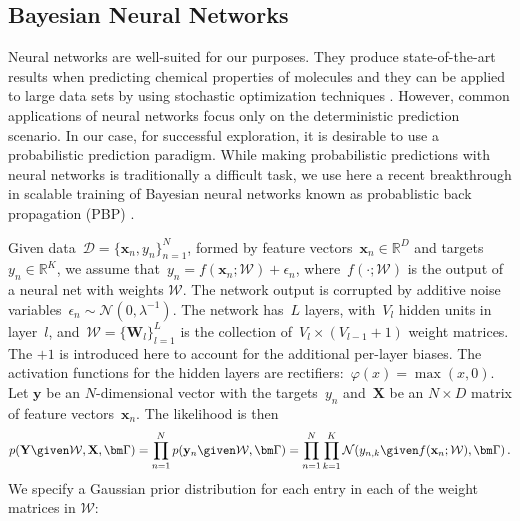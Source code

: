 \subsection{Bayesian Neural Networks}


Neural networks are well-suited for our purposes.
They produce state-of-the-art results when predicting chemical properties of molecules \cite{Ma_2015,Mayr_2016,ramsundar2015massively} and they can be applied to large data sets by using stochastic optimization techniques \cite{bousquet2008tradeoffs}. However, common applications of neural networks focus only on the deterministic prediction scenario. In our case, for successful exploration, it is desirable to use a probabilistic prediction paradigm. While making probabilistic predictions with neural networks is traditionally a difficult task, we use here a recent breakthrough in scalable training of Bayesian neural networks known as probablistic back propagation (PBP) \cite{hernandez2015probabilistic}. 

Given data~${\mathcal{D} = \{\mathbf{x}_n, y_n \}_{n=1}^N}$, formed by feature vectors~${\mathbf{x}_n \in \mathbb{R}^D}$ and targets~${y_n \in \mathbb{R}}^K$, we assume that~${y_n = f(\mathbf{x}_n;\mathcal{W}) + \epsilon_n}$,
where~$f(\cdot ;\mathcal{W})$ is the output of a neural net with weights $\mathcal{W}$. The network output is corrupted by additive noise variables~$\epsilon_n \sim \mathcal{N}(0,\lambda^{-1})$. The network has~$L$ layers, with~$V_l$ hidden units in layer~$l$, and~${\mathcal{W} = \{ \mathbf{W}_l \}_{l=1}^L}$ is the collection of~${V_l \times (V_{l-1}+1)}$ weight matrices. The $+1$ is introduced here to account for the additional per-layer biases.
The activation functions for the hidden layers are rectifiers:~${\varphi(x) = \max(x,0)}$. Let $\mathbf{y}$ be an $N$-dimensional vector with the targets~$y_n$ and~$\mathbf{X}$ be an ${N\times D}$ matrix of feature vectors~$\mathbf{x}_n$. The likelihood is then
\begin{align}
p(\mathbf{Y}\given\mathcal{W},\mathbf{X},\bm \Gamma) =
\prod_{n=1}^N p(\mathbf{y}_{n} \given \mathcal{W},\bm \Gamma) =
\prod_{n=1}^N \prod_{k=1}^K \mathcal{N}(y_{n,k} \given f(\mathbf{x}_n;\mathcal{W}),\bm \Gamma)\,.\label{eq:likelihood}
\end{align}
We specify a Gaussian prior distribution for each entry in each of the weight matrices in $\mathcal{W}$:

